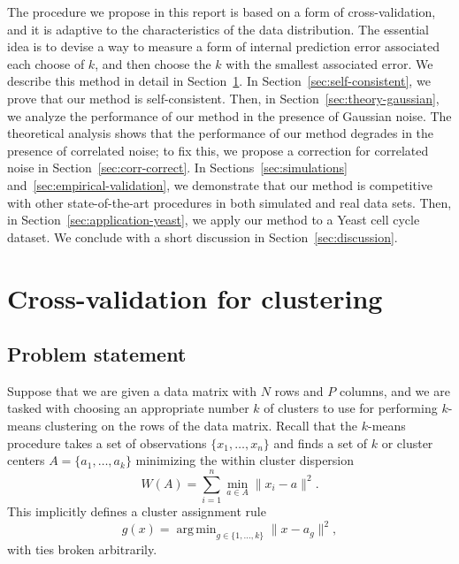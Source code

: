\documentclass[12pt]{article}
\DeclareMathOperator*{\argmin}{arg\,min}
\begin{document}
The procedure we propose in this report is based on a form of
cross-validation, and it is adaptive to the characteristics of the data
distribution. The essential idea is to devise a way to measure a form of
internal prediction error associated each choose of $k$, and then choose the
$k$ with the smallest associated error. We describe this method in detail in
Section~\ref{sec:meth}.  In Section~\ref{sec:self-consistent}, we prove that
our method is self-consistent. Then, in Section~\ref{sec:theory-gaussian}, we
analyze the performance of our method in the presence of Gaussian noise. The
theoretical analysis shows that the performance of our method degrades in the
presence of correlated noise; to fix this, we propose a correction for
correlated noise in Section~\ref{sec:corr-correct}. In
Sections~\ref{sec:simulations} and~\ref{sec:empirical-validation}, we
demonstrate that our method is competitive with other state-of-the-art
procedures in both simulated and real data sets. Then, in
Section~\ref{sec:application-yeast}, we apply our method to a Yeast cell cycle
dataset. We conclude with a short discussion in Section~\ref{sec:discussion}.


\section{Cross-validation for clustering}
\label{sec:meth}

\subsection{Problem statement}

Suppose that we are given a data matrix with $N$ rows and $P$ columns, and we
are tasked with choosing an appropriate number $k$ of clusters to use for
performing $k$-means clustering on the rows of the data matrix. Recall that
the $k$-means procedure takes a set of observations $\{ x_1, \dotsc ,x_n \}$
and finds a set of $k$ or cluster centers $A = \{ a_1, \dotsc, a_k \} $
minimizing the within cluster dispersion
\[
  W(A) = \sum_{i=1}^{n} \min_{a \in A} \|x_i - a\|^2.
\]
This implicitly defines a cluster assignment rule
\[
  g(x) = \argmin_{g \in \{1, \dotsc, k\}} \|x - a_g\|^2,
\]
with ties broken arbitrarily.
\end{document}
